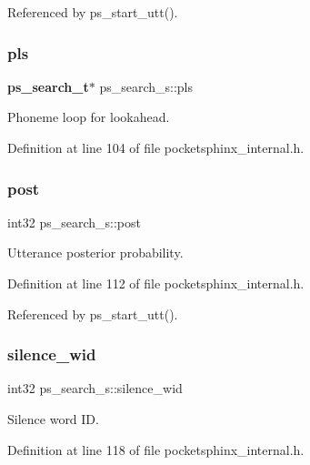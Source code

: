 Referenced by ps\+\_\+start\+\_\+utt().

\mbox{\label{structps__search__s_a2a33b7698fb237b42e007788f65cd46c}} 
\subsubsection{pls}
{\footnotesize\ttfamily \textbf{ ps\+\_\+search\+\_\+t}$\ast$ ps\+\_\+search\+\_\+s\+::pls}



Phoneme loop for lookahead. 



Definition at line 104 of file pocketsphinx\+\_\+internal.\+h.

\mbox{\label{structps__search__s_a721a656d0e34f7604ea8c52a1bdf14ff}} 
\subsubsection{post}
{\footnotesize\ttfamily int32 ps\+\_\+search\+\_\+s\+::post}



Utterance posterior probability. 



Definition at line 112 of file pocketsphinx\+\_\+internal.\+h.



Referenced by ps\+\_\+start\+\_\+utt().

\mbox{\label{structps__search__s_ab6851b4675f38ab6b3683d75521f000b}} 
\subsubsection{silence\+\_\+wid}
{\footnotesize\ttfamily int32 ps\+\_\+search\+\_\+s\+::silence\+\_\+wid}



Silence word ID. 



Definition at line 118 of file pocketsphinx\+\_\+internal.\+h.

\mbox{\label{structps__search__s_ae1a9fa33bfc851ec91ce96870714b3cc}} 

